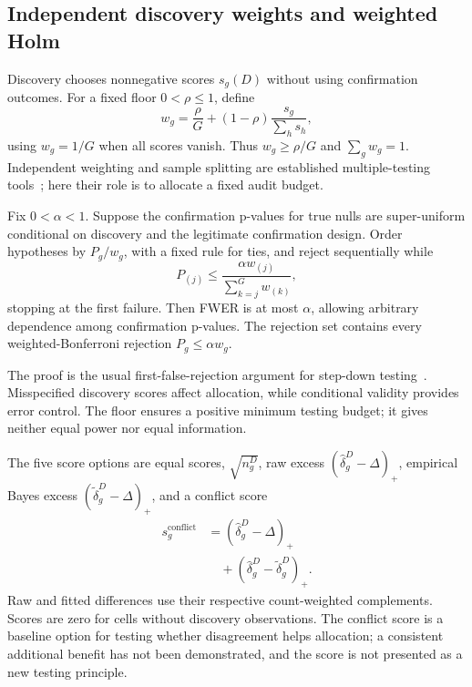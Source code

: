 \subsection{Independent discovery weights and weighted Holm}

Discovery chooses nonnegative scores $s_g(D)$ without using confirmation
outcomes. For a fixed floor $0<\rho\le1$, define
\begin{equation}
 w_g=\frac{\rho}{G}+(1-\rho)\frac{s_g}{\sum_hs_h},
 \label{eq:theory-weights}
\end{equation}
using $w_g=1/G$ when all scores vanish. Thus $w_g\ge\rho/G$ and
$\sum_gw_g=1$. Independent weighting and sample splitting are established
multiple-testing tools~\citep{kang2009weighted,rubin2006splitting}; here
their role is to allocate a fixed audit budget.

\begin{proposition}
\label{prop:theory-holm}
Fix $0<\alpha<1$. Suppose the confirmation p-values for true nulls are super-uniform conditional on
discovery and the legitimate confirmation design. Order hypotheses by
$P_g/w_g$, with a fixed rule for ties, and reject sequentially while
\begin{equation}
 P_{(j)}\le\frac{\alpha w_{(j)}}{\sum_{k=j}^G w_{(k)}},
 \label{eq:theory-holm}
\end{equation}
stopping at the first failure. Then FWER is at most $\alpha$, allowing
arbitrary dependence among confirmation p-values. The rejection set
contains every weighted-Bonferroni rejection $P_g\le\alpha w_g$.
\end{proposition}

The proof is the usual first-false-rejection argument for step-down
testing~\citep{holm1979simple}. Misspecified discovery scores affect
allocation, while conditional validity provides error control. The floor
ensures a positive minimum testing budget; it gives neither equal power
nor equal information.

The five score options are equal scores, $\sqrt{n_g^D}$, raw excess
$(\widehat\delta_g^D-\Delta)_+$, empirical Bayes excess
$(\widetilde\delta_g^D-\Delta)_+$, and a conflict score
\begin{equation}
 \begin{aligned}
 s_g^{\mathrm{conflict}}&=(\widehat\delta_g^D-\Delta)_+\\
 &\quad+(\widehat\delta_g^D-\widetilde\delta_g^D)_+.
 \end{aligned}
 \label{eq:theory-conflict}
\end{equation}
Raw and fitted differences use their respective count-weighted
complements. Scores are zero for cells without discovery observations.
The conflict score is a baseline option for testing whether disagreement
helps allocation; a consistent additional benefit has not been demonstrated, and the score is not
presented as a new testing principle.

